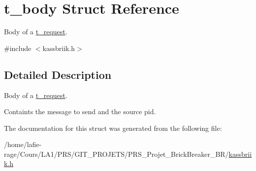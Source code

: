 \hypertarget{structt__body}{}\section{t\+\_\+body Struct Reference}
\label{structt__body}


Body of a \hyperlink{structt__request}{t\+\_\+request}.  




{\ttfamily \#include $<$kassbriik.\+h$>$}



\subsection{Detailed Description}
Body of a \hyperlink{structt__request}{t\+\_\+request}. 

Containts the message to send and the source pid. 

The documentation for this struct was generated from the following file\+:\begin{DoxyCompactItemize}
\item 
/home/lafie-\/rage/\+Cours/\+L\+A1/\+P\+R\+S/\+G\+I\+T\+\_\+\+P\+R\+O\+J\+E\+T\+S/\+P\+R\+S\+\_\+\+Projet\+\_\+\+Brick\+Breaker\+\_\+\+B\+R/\hyperlink{kassbriik_8h}{kassbriik.\+h}\end{DoxyCompactItemize}
